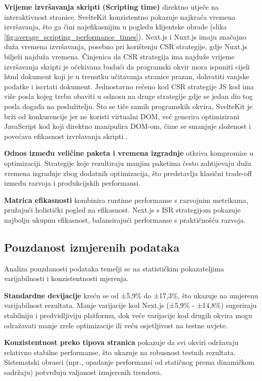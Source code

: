 \textbf{Vrijeme izvršavanja skripti (Scripting time)} direktno utječe na interaktivnost stranice. SvelteKit konzistentno pokazuje najkraća vremena izvršavanja, što ga čini najefikasnijim u pogledu klijentske obrade (slika \ref{fig:average_scripting_performance_times}). Next.js i Nuxt.js imaju značajno duža vremena izvršavanja, posebno pri korištenju CSR strategije, gdje Nuxt.js bilježi najduža vremena. Činjenica da CSR strategija ima najduže vrijeme izvršavanja skripti je očekivana budući da programski okvir mora ispuniti cijeli html dokument koji je u trenutku učitavanja stranice prazan, dohvatiti vanjske podatke i iscrtati dokument. Jednostavno rečeno kod CSR strategije JS kod ima više posla kojeg treba obaviti u odnosu na druge strategije gdje se jedan dio tog posla događa na poslužitelju. Što se tiče samih programskih okvira, SvelteKit je brži od konkurencije jer ne koristi virtualni DOM, već generira optimizirani JavaScript kod koji direktno manipulira DOM-om, čime se smanjuje složenost i povećava efikasnost izvršavanja skripti \cite{svelte2019reactivity}.


\textbf{Odnos između veličine paketa i vremena izgradnje} otkriva kompromise u optimizaciji. Strategije koje rezultiraju manjim paketima često zahtijevaju duža vremena izgradnje zbog dodatnih optimizacija, što predstavlja klasični trade-off između razvoja i produkcijskih performansi.

\textbf{Matrica efikasnosti} kombinira runtime performanse s razvojnim metrikama, pružajući holistički pogled na efikasnost. Next.js s ISR strategijom pokazuje najbolju ukupnu efikasnost, balansirajući performanse s praktičnošću razvoja.

\subsection{Pouzdanost izmjerenih podataka}

Analiza pouzdanosti podataka temelji se na statističkim pokazateljima varijabilnosti i konzistentnosti mjerenja.

\textbf{Standardne devijacije} kreću se od ±5,9\% do ±17,3\%, što ukazuje na umjerenu varijabilnost rezultata. Manje varijacije kod Next.js (±5,9\% - ±14,8\%) sugeriraju stabilniju i predvidljiviju platformu, dok veće varijacije kod drugih okvira mogu odražavati manje zrele optimizacije ili veću osjetljivost na testne uvjete.

\textbf{Konzistentnost preko tipova stranica} pokazuje da svi okviri održavaju relativno stabilne performanse, što ukazuje na robusnost testnih rezultata. Sistematski obrasci (npr., opadanje performansi od statičnog prema dinamičkom sadržaju) potvrđuju valjanost izmjerenih trendova.


